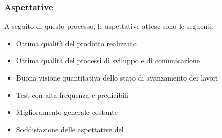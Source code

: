 \subsubsection{Aspettative}
A seguito di questo processo, le aspettative attese sono le seguenti:
\begin{itemize}
    \item{Ottima qualità del prodotto realizzato}
    \item{Ottima qualità dei processi di sviluppo e di comunicazione}
    \item{Buona visione quantitativa dello stato di avanzamento dei lavori}
    \item{Test con alta frequenza e predicibili}
    \item{Miglioramento generale costante}
    \item{Soddisfazione delle aspettative del }
\end{itemize}
